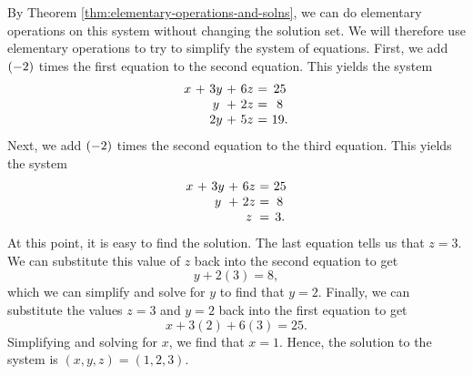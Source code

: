 \begin{solution}
  By Theorem \ref{thm:elementary-operations-and-solns}, we can do
  elementary operations on this system without changing the solution
  set. We will therefore use elementary operations to try to simplify
  the system of equations.  First, we add $\left(-2\right)$ times the
  first equation to the second equation. This yields the system
  \begin{equation*}
    \begin{array}{c@{~}c@{~}c@{~}c@{~}c@{~}c@{~}c}
      x&+&3y&+&6z&=&25 \\
       &&y&+&2z&=&8 \\
       &&2y&+&5z&=&19.
    \end{array}
    \label{solvingasystem2}
  \end{equation*}
  Next, we add $\left(-2\right)$ times the second equation to the
  third equation. This yields the system
  \begin{equation}
    \begin{array}{c@{~}c@{~}c@{~}c@{~}c@{~}c@{~}c}
      x&+&3y&+&6z&=&25 \\
      &&y&+&2z&=&8 \\
      &&&&z&=&3.
    \end{array}
    \label{solvingasystem3}
  \end{equation}
  At this point, it is easy to find the solution. The last equation
  tells us that $z=3$. We can substitute this value of $z$ back into
  the second equation to get
  \begin{equation*}
    y+2(3)=8,
  \end{equation*}
  which we can simplify and solve for $y$ to find that $y=2$. Finally,
  we can substitute the values $z=3$ and $y=2$ back into the first
  equation to get
  \begin{equation*}
    x+3(2)+6(3)=25.
  \end{equation*}
  Simplifying and solving for $x$, we find that $x=1$. Hence, the
  solution to the system is $(x,y,z)=(1,2,3)$.


\end{solution}
